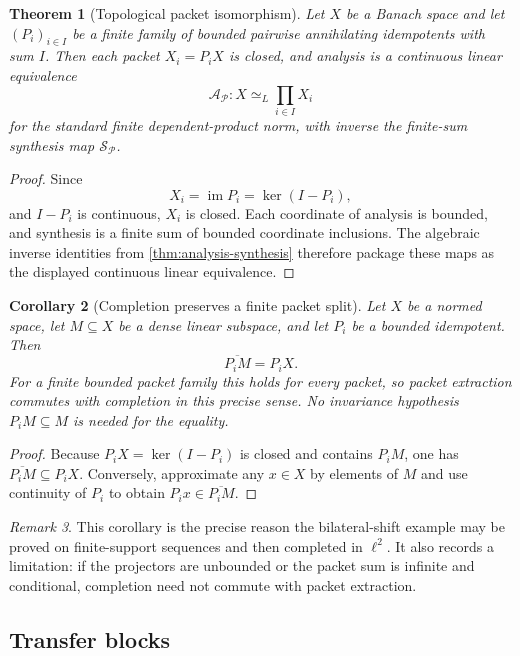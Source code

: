 \documentclass[11pt]{article}
\newtheorem{theorem}{Theorem}[section]
\newtheorem{corollary}[theorem]{Corollary}
\theoremstyle{definition}
\theoremstyle{remark}
\newtheorem{remark}[theorem]{Remark}
\newcommand{\cP}{\mathcal P}
\newcommand{\im}{\operatorname{im}}
\newcommand{\closure}[1]{\overline{#1}}
\begin{document}
\begin{theorem}[Topological packet isomorphism]
\label{thm:topological-packets}
Let $X$ be a Banach space and let $(P_i)_{i\in I}$ be a finite family of bounded pairwise annihilating idempotents with sum $I$. Then each packet $X_i=P_iX$ is closed, and analysis is a continuous linear equivalence
\[
{
\mathcal A_{\cP}:X\simeq_L\prod_{i\in I}X_i
}
\]
for the standard finite dependent-product norm, with inverse the finite-sum synthesis map $\mathcal S_{\cP}$.
\end{theorem}

\begin{proof}
Since
\[
X_i=\im P_i=\ker(I-P_i),
\]
and $I-P_i$ is continuous, $X_i$ is closed. Each coordinate of analysis is bounded, and synthesis is a finite sum of bounded coordinate inclusions. The algebraic inverse identities from \cref{thm:analysis-synthesis} therefore package these maps as the displayed continuous linear equivalence.
\end{proof}

\begin{corollary}[Completion preserves a finite packet split]
\label{cor:completion-packet-split}
Let $X$ be a normed space, let $M\subseteq X$ be a dense linear subspace, and let $P_i$ be a bounded idempotent. Then
\[
{\closure{P_iM}=P_iX.}
\]
For a finite bounded packet family this holds for every packet, so packet extraction commutes with completion in this precise sense. No invariance hypothesis $P_iM\subseteq M$ is needed for the equality.
\end{corollary}

\begin{proof}
Because $P_iX=\ker(I-P_i)$ is closed and contains $P_iM$, one has $\closure{P_iM}\subseteq P_iX$. Conversely, approximate any $x\in X$ by elements of $M$ and use continuity of $P_i$ to obtain $P_ix\in\closure{P_iM}$.
\end{proof}

\begin{remark}
This corollary is the precise reason the bilateral-shift example may be proved on finite-support sequences and then completed in $\ell^2$. It also records a limitation: if the projectors are unbounded or the packet sum is infinite and conditional, completion need not commute with packet extraction.
\end{remark}

\subsection{Transfer blocks}
\end{document}

